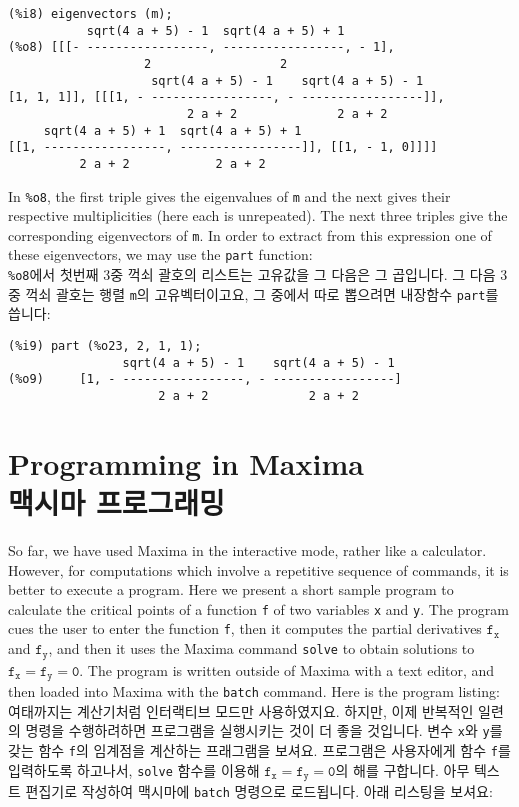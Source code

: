 \documentclass[a4paper,12pt]{article}
\begin{document}
\noindent\begin{minipage}{\textwidth}
\begin{verbatim}
(%i8) eigenvectors (m);
           sqrt(4 a + 5) - 1  sqrt(4 a + 5) + 1
(%o8) [[[- -----------------, -----------------, - 1], 
                   2                  2
                    sqrt(4 a + 5) - 1    sqrt(4 a + 5) - 1
[1, 1, 1]], [[[1, - -----------------, - -----------------]], 
                         2 a + 2              2 a + 2
     sqrt(4 a + 5) + 1  sqrt(4 a + 5) + 1
[[1, -----------------, -----------------]], [[1, - 1, 0]]]]
          2 a + 2            2 a + 2
\end{verbatim}
In {\tt \%o8}, the first triple gives the eigenvalues of {\tt m} and 
the next gives their respective multiplicities (here each is 
unrepeated).  The next three triples give the corresponding
eigenvectors of {\tt m}.  In order to extract from this expression 
one of these eigenvectors, we may use the {\tt part} function: \\
{\tt \%o8}에서 첫번째 3중 꺽쇠 괄호의 리스트는 고유값을 그 다음은 
그 곱입니다. 그 다음 3중 꺽쇠 괄호는 행렬 {\tt m}의 고유벡터이고요, 
그 중에서 따로 뽑으려면 내장함수 {\tt part}를 씁니다:
\begin{verbatim}
(%i9) part (%o23, 2, 1, 1);
                sqrt(4 a + 5) - 1    sqrt(4 a + 5) - 1
(%o9)     [1, - -----------------, - -----------------]
                     2 a + 2              2 a + 2
\end{verbatim}
\end{minipage}

\section{Programming in Maxima \\맥시마 프로그래밍 \label{sec:programming}}

So far, we have used Maxima in the interactive mode, rather like a 
calculator.  However, for computations which involve a repetitive 
sequence of commands, it is better to execute a program. Here we 
present a short sample program to calculate the critical points of a 
function {\tt f} of two variables {\tt x} and {\tt y}.  The program 
cues the user to enter the function {\tt f}, then it computes the 
partial derivatives $\mathtt{f_x}$ and $\mathtt{f_y}$, and then it 
uses the Maxima command {\tt solve} to obtain solutions to 
$\mathtt{f_x = f_y = 0}$.  The program is written outside of Maxima 
with a text editor, and then loaded into Maxima with the {\tt batch} 
command.  Here is the program listing: \\
여태까지는 계산기처럼 인터랙티브 모드만 사용하였지요. 하지만, 이제 
반복적인 일련의 명령을 수행하려하면 프로그램을 실행시키는 것이 더 좋을 
것입니다. 변수 {\tt x}와 {\tt y}를 갖는 함수 {\tt f}의 임계점을 계산하는
프래그램을 보셔요. 프로그램은 사용자에게 함수 {\tt f}를 입력하도록 
하고나서, {\tt solve} 함수를 이용해 $\mathtt{f_x = f_y = 0}$의 해를 
구합니다. 아무 텍스트 편집기로 작성하여 맥시마에  {\tt batch} 명령으로
로드됩니다. 아래 리스팅을 보셔요:
\end{document}
